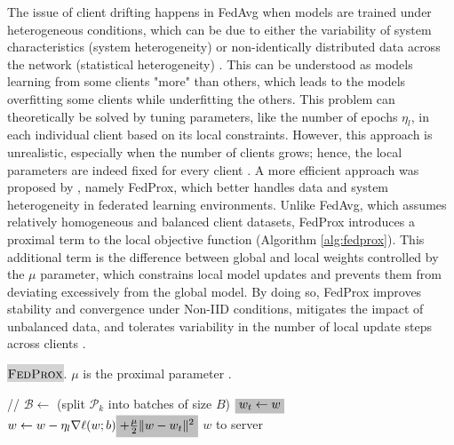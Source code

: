 The issue of client drifting happens in FedAvg when models are trained under heterogeneous conditions, which can be due to either the variability of system characteristics (system heterogeneity) or non-identically distributed data across the network (statistical heterogeneity) \citep{fexprox}. This can be understood as models learning from some clients "more" than others, which leads to the models overfitting some clients while underfitting the others. This problem can theoretically be solved by tuning parameters, like the number of epochs $\eta_l$, in each individual client based on its local constraints. However, this approach is unrealistic, especially when the number of clients grows; hence, the local parameters are indeed fixed for every client \citep{fexprox}. A more efficient approach was proposed by \cite{fexprox}, namely FedProx, which better handles data and system heterogeneity in federated learning environments. Unlike FedAvg, which assumes relatively homogeneous and balanced client datasets, FedProx introduces a proximal term to the local objective function (Algorithm \ref{alg:fedprox}). This additional term is the difference between global and local weights controlled by the $\mu$ parameter, which constrains local model updates and prevents them from deviating excessively from the global model. By doing so, FedProx improves stability and convergence under Non-IID conditions, mitigates the impact of unbalanced data, and tolerates variability in the number of local update steps across clients \citep{fexprox}.

\begin{algorithm}
  \caption{\colorbox{lightgray}{$\textsc{FedProx}$}. $\mu$ is the proximal parameter \citep{fexprox}.}
\label{alg:fedprox}
\begin{algorithmic}[1]
 \quad // 
    \State $\mathcal{B} \gets$ (split $\mathcal{P}_k$ into batches of size $B$)
    \State $\colorbox{lightgray}{$w_{t} \gets w$}$ 
            \State $w \gets w - \eta_l \nabla \ell(w; b) \colorbox{lightgray}{$+ \frac{\mu}{2} \lVert w - w_t \rVert^{2}$}$
        \EndFor
    \EndFor
    \State \Return $w$ to server
\EndFunction
\end{algorithmic}
\end{algorithm}

